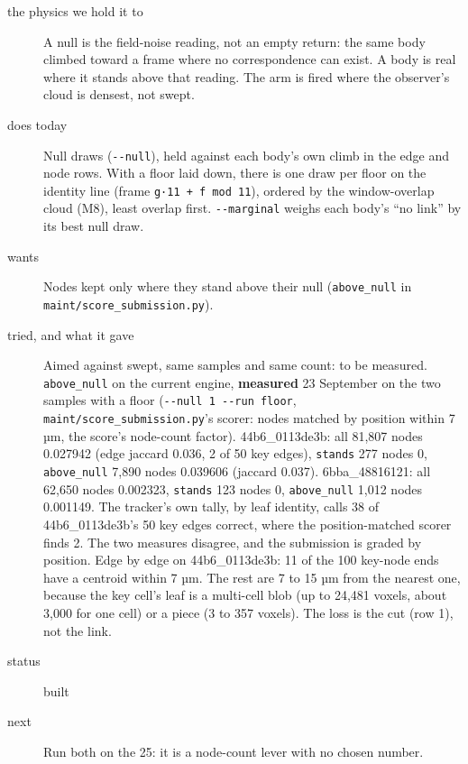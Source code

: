 \begin{description}
\item[{the physics we hold it to}] A null is the field-noise reading, not an empty return: the same body climbed toward a frame where no correspondence can exist. A body is real where it stands above that reading. The arm is fired where the observer's cloud is densest, not swept.
\item[{does today}] Null draws (\texttt{-\allowbreak{}-\allowbreak{}null}), held against each body's own climb in the edge and node rows. With a floor laid down, there is one draw per floor on the identity line (frame \texttt{g·11 + f mod 11}), ordered by the window-overlap cloud (M8), least overlap first. \texttt{-\allowbreak{}-\allowbreak{}marginal} weighs each body's “no link” by its best null draw.
\item[{wants}] Nodes kept only where they stand above their null (\texttt{above\_\allowbreak{}null} in \texttt{maint/\allowbreak{}score\_\allowbreak{}submission.\allowbreak{}py}).
\item[{tried, and what it gave}] Aimed against swept, same samples and same count: to be measured. \texttt{above\_\allowbreak{}null} on the current engine, \textbf{measured} 23 September on the two samples with a floor (\texttt{-\allowbreak{}-\allowbreak{}null 1 -\allowbreak{}-\allowbreak{}run floor}, \texttt{maint/\allowbreak{}score\_\allowbreak{}submission.\allowbreak{}py}'s scorer: nodes matched by position within 7 µm, the score's node-count factor). 44b6\_\allowbreak{}0113de3b: all 81,807 nodes 0.027942 (edge jaccard 0.036, 2 of 50 key edges), \texttt{stands} 277 nodes 0, \texttt{above\_\allowbreak{}null} 7,890 nodes 0.039606 (jaccard 0.037). 6bba\_\allowbreak{}48816121: all 62,650 nodes 0.002323, \texttt{stands} 123 nodes 0, \texttt{above\_\allowbreak{}null} 1,012 nodes 0.001149. The tracker's own tally, by leaf identity, calls 38 of 44b6\_\allowbreak{}0113de3b's 50 key edges correct, where the position-matched scorer finds 2. The two measures disagree, and the submission is graded by position. Edge by edge on 44b6\_\allowbreak{}0113de3b: 11 of the 100 key-node ends have a centroid within 7 µm. The rest are 7 to 15 µm from the nearest one, because the key cell's leaf is a multi-cell blob (up to 24,481 voxels, about 3,000 for one cell) or a piece (3 to 357 voxels). The loss is the cut (row 1), not the link.
\item[{status}] built
\item[{next}] Run both on the 25: it is a node-count lever with no chosen number.
\end{description}

